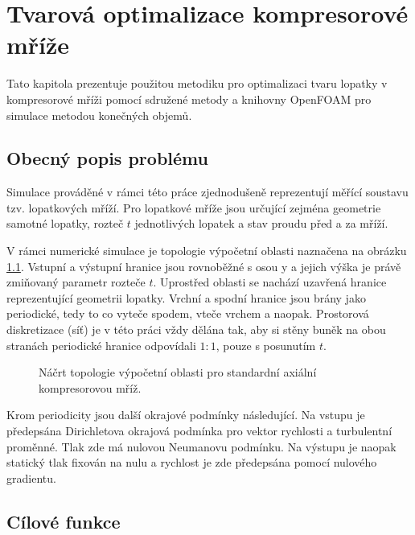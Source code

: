 
\chapter{Tvarová optimalizace kompresorové mříže}

Tato kapitola prezentuje použitou metodiku pro optimalizaci tvaru lopatky v kompresorové mříži pomocí sdružené metody a knihovny OpenFOAM pro simulace metodou konečných objemů.

\section{Obecný popis problému}

Simulace prováděné v rámci této práce zjednodušeně reprezentují měřící soustavu tzv. lopatkových mříží. Pro lopatkové mříže jsou určující zejména geometrie samotné lopatky, rozteč $ t $ jednotlivých lopatek a stav proudu před a za mříží.

V rámci numerické simulace je topologie výpočetní oblasti naznačena na obrázku \ref{fig:vypocetni_oblast}. Vstupní a výstupní hranice jsou rovnoběžné s osou y a jejich výška je právě zmiňovaný parametr rozteče $ t $. Uprostřed oblasti se nachází uzavřená hranice reprezentující geometrii lopatky. Vrchní a spodní hranice jsou brány jako periodické, tedy to co vyteče spodem, vteče vrchem a naopak. Prostorová diskretizace (síť) je v této práci vždy dělána tak, aby si stěny buněk na obou stranách periodické hranice odpovídali $ 1:1 $, pouze s posunutím $ t $.

\begin{figure}
	\def\svgwidth{0.8\textwidth}
	\graphicspath{{img/inkscape/}}
	
	\caption[Topologie výpočetní oblasti]{Náčrt topologie výpočetní oblasti pro standardní axiální kompresorovou mříž.}
	\label{fig:vypocetni_oblast}
\end{figure}

Krom periodicity jsou další okrajové podmínky následující. Na vstupu je předepsána Dirichletova okrajová podmínka pro vektor rychlosti a turbulentní proměnné. Tlak zde má nulovou Neumanovu podmínku. Na výstupu je naopak statický tlak fixován na nulu a rychlost je zde předepsána pomocí nulového gradientu.

\section{Cílové funkce}

